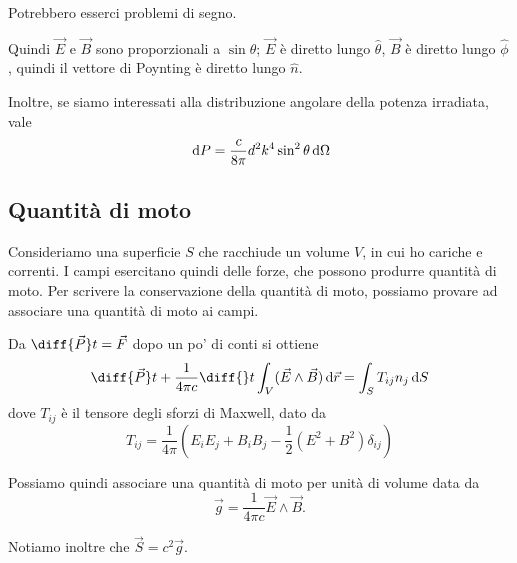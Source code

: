 \documentclass[a4paper,10pt,oneside]{math_article}
\begin{document}
			Potrebbero esserci problemi di segno.

			Quindi $\vec E$ e $\vec B$ sono proporzionali a $\sin \theta$; $\vec E$ è diretto lungo $\hat \theta$, $\vec B$ è diretto lungo $\hat \phi$, quindi il vettore di Poynting è diretto lungo $\hat n$.
			
			Inoltre, se siamo interessati alla distribuzione angolare della potenza irradiata, vale
			\[
			 \, \textrm{d} P = \frac c{8\pi} d^2k^4\sin^2\theta  \, \textrm{d}\Omega
			\]

			
		\subsection{Quantità di moto}
			Consideriamo una superficie $S$ che racchiude un volume $V$, in cui ho cariche e correnti. I campi esercitano quindi delle forze, che possono produrre quantità di moto. Per scrivere la conservazione della quantità di moto, possiamo provare ad associare una quantità di moto ai campi.
			
			Da $\diff {\vec P}t = \vec F$  dopo un po' di conti si ottiene 
			\begin{equation}
					\diff {\vec P}t + \frac1{4\pi c}\diff{}t \int_V (\vec E \wedge \vec B) \de\vec r = \int_S T_{ij}n_j \de S
			\end{equation}
			dove $T_{ij}$ è il tensore degli sforzi di Maxwell, dato da 
			\begin{equation}
				T_{ij} = \frac1{4\pi} \left(E_iE_j+B_iB_j - \frac12 (E^2 + B^2) \delta_{ij}\right)
			\end{equation}
			
			Possiamo quindi associare una quantità di moto per unità di volume data da 
			\begin{equation}
				\vec g = \frac1{4	\pi c} \vec E \wedge \vec B.
			\end{equation}
			
			Notiamo inoltre che $\vec S = c^2 \vec g$.			

		
\end{document}

